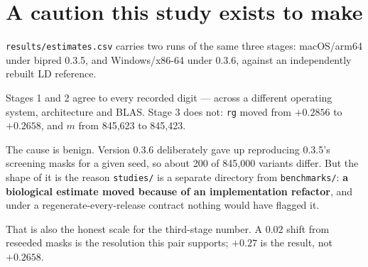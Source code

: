 \section*{A caution this study exists to make}

\texttt{results/estimates.csv} carries two runs of the same three stages:
macOS/arm64 under bipred 0.3.5, and Windows/x86-64 under 0.3.6, against an
independently rebuilt LD reference.

Stages 1 and 2 agree to every recorded digit --- across a different operating
system, architecture and BLAS. Stage 3 does not: \texttt{rg} moved from
$+0.2856$ to $+0.2658$, and $m$ from 845{,}623 to 845{,}423.

The cause is benign. Version 0.3.6 deliberately gave up reproducing 0.3.5's
screening masks for a given seed, so about 200 of 845{,}000 variants differ.
But the shape of it is the reason \texttt{studies/} is a separate directory
from \texttt{benchmarks/}: \textbf{a biological estimate moved because of an
implementation refactor}, and under a regenerate-every-release contract nothing
would have flagged it.

That is also the honest scale for the third-stage number. A $0.02$ shift from
reseeded masks is the resolution this pair supports; $+0.27$ is the result,
not $+0.2658$.
